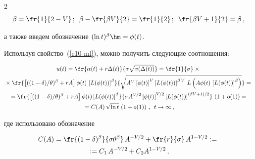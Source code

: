 \begin{multicols}{2}
\begin{equation*}
\beta=\fr{1}{2-V}\,;\enskip \beta-\fr{\beta V}{2}=\fr{1}{2}\,;\enskip


\fr{\beta V +1}{2}=\beta\,,


\end{equation*}


а также введем обозначение  $(\ln t)^\beta\hm=\phi(t)$.


 Используя свойство~(\ref{e10-ml}), можно получить следующие соотношения:


 


 \noindent


\begin{multline*}


u(t) =  \fr{ \alpha(t)+r\Delta(t) }{\sigma\sqrt{v(\Delta(t))}}=\fr{1}{\sigma}\times{}\\


{}\times\fr{\left[((1-\delta)/\theta)^\beta+rA\right] \phi(t)\,


\left[L(  \phi(t))\right]^\beta}{\sqrt{ A^V \left[\phi(t)\right]^ V \left[L ( \phi(t)


)\right]^{\beta \,V}\,L\left( A \phi(t)\,\left[L(


\phi(t))\right]^\beta\right )}}={}\\


{}= \fr{\left[((1-\delta)/\theta)^\beta+rA\right]


\phi(t) \left[L(\phi(t))\right]^\beta} {\sigma A^{{V}/{2}}


\left[\phi(t)\right]^{{V}/{2}}\left[L(\phi(t))\right]^{(\beta V+1)/2}}\,


\left(1+o(1)\right)={}\\


{}=C(A)\,\sqrt{\ln t}\,\left(1+o(1)\right)\,,\enskip t \to \infty\,,


\end{multline*}


где использовано обозначение





\noindent


\begin{multline*}


C(A)=\fr{(1-\delta)^\beta}{\sigma\theta^\beta}\,


A^{-{V}/{2}}+\fr{r}{\sigma}\,A^{1-{V}/{2}}:={}\\


{}:=C_1\,A^{-{V}/{2}}+C_2 A^{1-{V}/{2}}\,,





\end{multline*}
\end{multicols}
